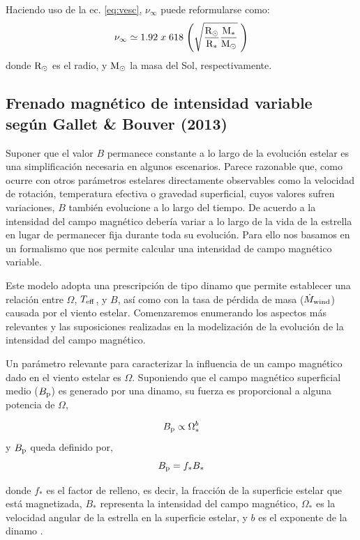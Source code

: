 Haciendo uso de la ec. \ref{eq:vesc}, $\nu_\infty$ puede reformularse como:
\begin{equation}
    \nu_\infty \simeq 1.92 \; x \; 618 \; \Bigg(\sqrt{\frac{\mathrm{R}_\odot}{\mathrm{R}_*}\frac{\mathrm{M}_*}{\mathrm{M}_\odot}} \;\Bigg) \label{eq:vinf}
\end{equation}
donde ${\mathrm{R}_\odot}$ es el radio, y ${\mathrm{M}_\odot}$ la masa del Sol, respectivamente. \par

\subsection{Frenado magnético de intensidad variable según Gallet \& Bouver (2013)}
Suponer que el valor $B$ permanece constante a lo largo de la evolución estelar es una simplificación necesaria en algunos escenarios. Parece razonable que, como ocurre con otros parámetros estelares directamente observables como la velocidad de rotación, temperatura efectiva o gravedad superficial, cuyos valores sufren variaciones, $B$ también evolucione a lo largo del tiempo. De acuerdo a \cite{Gallet2013} la intensidad del campo magnético debería variar a lo largo de la vida de la estrella en lugar de permanecer fija durante toda su evolución. Para ello nos basamos en un formalismo que nos permite calcular una intensidad de campo magnético variable.\par 

Este modelo adopta una prescripción de tipo dinamo que permite establecer una relación entre $\Omega$, $T_{\mathrm{eff}}$, y $B$, así como con la tasa de pérdida de masa ($\Dot{M}_{\mathrm{wind}}$) causada por el viento estelar. Comenzaremos enumerando los aspectos más relevantes y las suposiciones realizadas en la modelización de la evolución de la intensidad del campo magnético.\par 

Un parámetro relevante para caracterizar la influencia de un campo magnético dado en el viento estelar es $\Omega$. Suponiendo que el campo magnético superficial medio ($B_{\mathrm{p}}$) es generado por una dinamo, su fuerza es proporcional a alguna potencia de $\Omega$,

\begin{equation}
	B_{\mathrm{p}} \propto \Omega_*^b \label{eq:mf_strenght}
\end{equation}
y $B_{\mathrm{p}}$ queda definido por,
\begin{equation}
	B_{\mathrm{p}} = f_*B_* \label{eq:bp}
\end{equation}

donde $f_*$ es el factor de relleno, es decir, la fracción de la superficie estelar que está magnetizada, $B_*$ representa la intensidad del campo magnético, $\Omega_*$ es la velocidad angular de la estrella en la superficie estelar, y $b$ es el exponente de la dinamo \citep{Gallet2013}.\par

